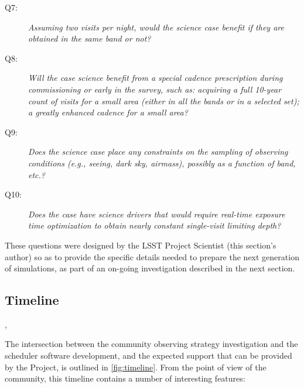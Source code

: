 \begin{description}

\item[Q7:] {\it Assuming two visits per night, would the science case
benefit if they are obtained in the same band or not?}


\item[Q8:] {\it Will the case science benefit from a special cadence
prescription during commissioning or early in the survey, such as:
acquiring a full 10-year count of visits for a small area (either in all
the bands or in a  selected set); a greatly enhanced cadence for a small
area?}


\item[Q9:] {\it Does the science case place any constraints on the
sampling of observing conditions (e.g., seeing, dark sky, airmass),
possibly as a function of band, etc.?}


\item[Q10:] {\it Does the case have science drivers that would require
real-time exposure time optimization to obtain nearly constant
single-visit limiting depth?}


\end{description}

These questions were designed by the LSST Project Scientist (this section's author) so as to provide the specific details needed to prepare the next generation of \OpSim simulations, as part of an on-going investigation described in the next section.



\subsection{Timeline}
\def\secname{intro:timeline}\label{sec:\secname}

,

The intersection between the community observing strategy investigation and the scheduler software development,
and the expected support that can be provided by the Project, is
outlined in \autoref{fig:timeline}. From the point of view of the community, this timeline contains a number of interesting features:

